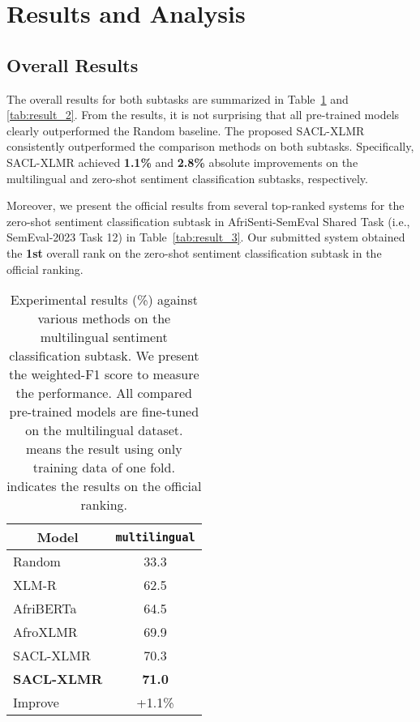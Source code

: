 \documentclass[11pt]{article}
\begin{document}
\section{Results and Analysis}

\subsection{Overall Results}
The overall results  for both subtasks are summarized in Table~\ref{tab:result_1} and \ref{tab:result_2}. 
From the results, it is not surprising that all pre-trained models clearly outperformed the Random baseline. The proposed SACL-XLMR consistently outperformed the comparison methods on both subtasks. 
Specifically, SACL-XLMR achieved \textbf{1.1\%} and \textbf{2.8\%} absolute improvements on the multilingual and zero-shot sentiment classification subtasks, respectively.


Moreover, we present the official results from
several top-ranked systems for the zero-shot sentiment classification subtask in AfriSenti-SemEval Shared Task (i.e., SemEval-2023 Task 12) in Table~\ref{tab:result_3}.
Our submitted system obtained the \textbf{1st} overall rank on the zero-shot sentiment classification subtask in the official ranking.



\begin{table}[t]
\centering
\begin{tabular}{l|c}
\hline
\multicolumn{1}{c|}{\multirow{1}{*}{Model}} & \texttt{multilingual} \\
\hline
Random      & 33.3 \\ 
XLM-R       & 62.5 \\
AfriBERTa   & 64.5 \\
AfroXLMR    & 69.9 \\
\hline
SACL-XLMR     & 70.3 \\ 
\textbf{SACL-XLMR}  & \textbf{71.0} \\ 
Improve     & +1.1\% \\
\hline
\end{tabular}
\caption{
Experimental results (\%) against various methods on the multilingual sentiment classification subtask.
We present the weighted-F1 score to measure the performance.
All compared pre-trained models are fine-tuned on the multilingual dataset.
 means the result using only training data of one fold.
 indicates the results on the official ranking.
}
\label{tab:result_1}
\end{table}
\end{document}
